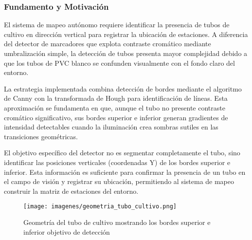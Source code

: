\subsubsection{Fundamento y Motivación}

El sistema de mapeo autónomo requiere identificar la presencia de tubos de cultivo en dirección vertical para registrar la ubicación de estaciones. A diferencia del detector de marcadores que explota contraste cromático mediante umbralización simple, la detección de tubos presenta mayor complejidad debido a que los tubos de PVC blanco se confunden visualmente con el fondo claro del entorno.

La estrategia implementada combina detección de bordes mediante el algoritmo de Canny con la transformada de Hough para identificación de líneas. Esta aproximación se fundamenta en que, aunque el tubo no presente contraste cromático significativo, sus bordes superior e inferior generan gradientes de intensidad detectables cuando la iluminación crea sombras sutiles en las transiciones geométricas.

El objetivo específico del detector no es segmentar completamente el tubo, sino identificar las posiciones verticales (coordenadas Y) de los bordes superior e inferior. Esta información es suficiente para confirmar la presencia de un tubo en el campo de visión y registrar su ubicación, permitiendo al sistema de mapeo construir la matriz de estaciones del entorno.

\begin{figure}[h]
\centering
\texttt{[image: imagenes/geometria\_tubo\_cultivo.png]}
\caption{Geometría del tubo de cultivo mostrando los bordes superior e inferior objetivo de detección}
\label{fig:geometria_tubo}
\end{figure}
